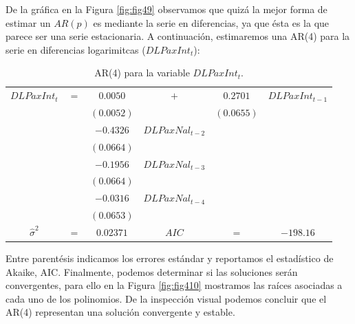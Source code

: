 \documentclass[
]{book}
\begin{document}
De la gráfica en la Figura \ref{fig:fig49} observamos que quizá la mejor forma de estimar un \(AR(p)\) es mediante la serie en diferencias, ya que ésta es la que parece ser una serie estacionaria. A continuación, estimaremos una AR(4) para la serie en diferencias logarimitcas (\(DLPaxInt_t\)):

\begin{longtable}[]{@{}cccccc@{}}
\caption{\label{tab:AR04} AR(4) para la variable \(DLPaxInt_t\).}\tabularnewline
\toprule\noalign{}
\endfirsthead
\endhead
\bottomrule\noalign{}
\endlastfoot
\(DLPaxInt_t\) & \(=\) & \(0.0050\) & \(+\) & \(0.2701\) & \(DLPaxInt_{t-1}\) \\
& & \((0.0052)\) & & \((0.0655)\) & \\
& & \(-0.4326\) & \(DLPaxNal_{t-2}\) & & \\
& & \((0.0664)\) & & & \\
& & \(-0.1956\) & \(DLPaxNal_{t-3}\) & & \\
& & \((0.0664)\) & & & \\
& & \(-0.0316\) & \(DLPaxNal_{t-4}\) & & \\
& & \((0.0653)\) & & & \\
\(\hat{\sigma}^2\) & \(=\) & \(0.02371\) & \(AIC\) & \(=\) & \(-198.16\) \\
\end{longtable}

Entre parentésis indicamos los errores estándar y reportamos el estadístico de Akaike, AIC. Finalmente, podemos determinar si las
soluciones serán convergentes, para ello en la Figura \ref{fig:fig410} mostramos las raíces asociadas a cada uno de los polinomios. De la inspección visual podemos concluir que el AR(4) representan una solución convergente y estable.
\end{document}
